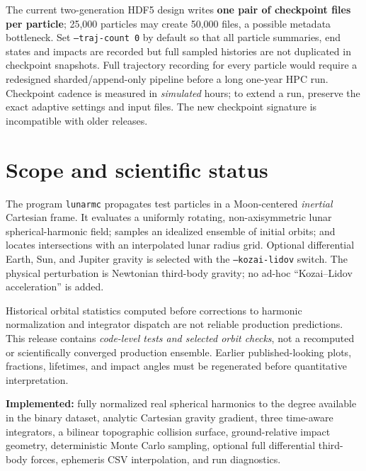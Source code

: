 \documentclass[11pt,a4paper]{article}
\newcommand{\opt}[1]{\texttt{#1}}
\newcommand{\pathcode}[1]{\nolinkurl{#1}}
\begin{document}
\begin{warningbox}[title={25,000 particle HPC I/O warning}]
The current two-generation HDF5 design writes \textbf{one pair of checkpoint
files per particle}; 25,000 particles may create 50,000 files, a possible
metadata bottleneck. Set \opt{--traj-count 0} by default so that all particle
summaries, end states and impacts are recorded but full sampled histories are
not duplicated in checkpoint snapshots. Full trajectory recording for every
particle would require a redesigned sharded/append-only pipeline before a
long one-year HPC run. Checkpoint cadence is measured in \emph{simulated}
hours; to extend a run, preserve the exact adaptive settings and input files.
The new checkpoint signature is incompatible with older releases.
\end{warningbox}

\section{Scope and scientific status}
The program \pathcode{lunarmc} propagates test particles in a Moon-centered \emph{inertial} Cartesian frame. It evaluates a uniformly rotating, non-axisymmetric lunar spherical-harmonic field; samples an idealized ensemble of initial orbits; and locates intersections with an interpolated lunar radius grid. Optional differential Earth, Sun, and Jupiter gravity is selected with the \opt{--kozai-lidov} switch. The physical perturbation is Newtonian third-body gravity; no ad-hoc ``Kozai--Lidov acceleration'' is added.

\begin{warningbox}[title={Do not treat historical outputs as corrected predictions}]
Historical orbital statistics computed before corrections to harmonic normalization and integrator dispatch are not reliable production predictions. This release contains \emph{code-level tests and selected orbit checks}, not a recomputed or scientifically converged production ensemble. Earlier published-looking plots, fractions, lifetimes, and impact angles must be regenerated before quantitative interpretation.
\end{warningbox}

\textbf{Implemented:} fully normalized real spherical harmonics to the degree available in the binary dataset, analytic Cartesian gravity gradient, three time-aware integrators, a bilinear topographic collision surface, ground-relative impact geometry, deterministic Monte Carlo sampling, optional full differential third-body forces, ephemeris CSV interpolation, and run diagnostics.
\end{document}
